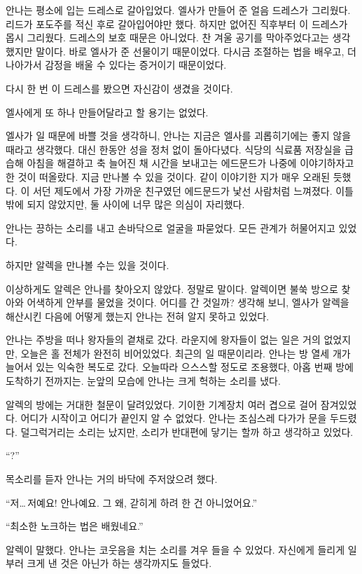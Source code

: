 안나는 평소에 입는 드레스로 갈아입었다. 엘사가 만들어 준 얼음 드레스가 그리웠다. 리드가 포도주를 적신 후로 갈아입어야만 했다. 하지만 없어진 직후부터 이 드레스가 몹시 그리웠다. 드레스의 보호 때문은 아니었다. 찬 겨울 공기를 막아주었다고는 생각했지만 말이다. 바로 엘사가 준 선물이기 때문이었다. 다시금 조절하는 법을 배우고, 더 나아가서 감정을 배울 수 있다는 증거이기 때문이었다.

다시 한 번 이 드레스를 봤으면 자신감이 생겼을 것이다.

엘사에게 또 하나 만들어달라고 할 용기는 없었다.

엘사가 일 때문에 바쁠 것을 생각하니, 안나는 지금은 엘사를 괴롭히기에는 좋지 않을 때라고 생각했다. 대신 한동안 성을 정처 없이 돌아다녔다. 식당의 식료품 저장실을 급습해 아침을 해결하고 축 늘어진 채 시간을 보내고는 에드문드가 나중에 이야기하자고 한 것이 떠올랐다. 지금 만나볼 수 있을 것이다. 같이 이야기한 지가 매우 오래된 듯했다. 이 서던 제도에서 가장 가까운 친구였던 에드문드가 낯선 사람처럼 느껴졌다. 이틀밖에 되지 않았지만, 둘 사이에 너무 많은 의심이 자리했다.

안나는 끙하는 소리를 내고 손바닥으로 얼굴을 파묻었다. 모든 관계가 허물어지고 있었다.

하지만 알렉을 만나볼 수는 있을 것이다.

이상하게도 알렉은 안나를 찾아오지 않았다. 정말로 말이다. 알렉이면 불쑥 방으로 찾아와 어색하게 안부를 물었을 것이다. 어디를 간 것일까? 생각해 보니, 엘사가 알렉을 해산시킨 다음에 어떻게 했는지 안나는 전혀 알지 못하고 있었다.

안나는 주방을 떠나 왕자들의 곁채로 갔다. 라운지에 왕자들이 없는 일은 거의 없었지만, 오늘은 홀 전체가 완전히 비어있었다. 최근의 일 때문이리라. 안나는 방 열세 개가 늘어서 있는 익숙한 복도로 갔다. 오늘따라 으스스할 정도로 조용했다, 아홉 번째 방에 도착하기 전까지는. 눈앞의 모습에 안나는 크게 헉하는 소리를 냈다.

알렉의 방에는 거대한 철문이 달려있었다. 기이한 기계장치 여러 겹으로 걸어 잠겨있었다. 어디가 시작이고 어디가 끝인지 알 수 없었다. 안나는 조심스레 다가가 문을 두드렸다. 덜그럭거리는 소리는 났지만, 소리가 반대편에 닿기는 할까 하고 생각하고 있었다.

``?''

목소리를 듣자 안나는 거의 바닥에 주저앉으려 했다.

``저\ldots\,저예요! 안나예요. 그 왜, 갇히게 하려 한 건 아니었어요.''

``최소한 노크하는 법은 배웠네요.''

알렉이 말했다. 안나는 코웃음을 치는 소리를 겨우 들을 수 있었다. 자신에게 들리게 일부러 크게 낸 것은 아닌가 하는 생각까지도 들었다.

